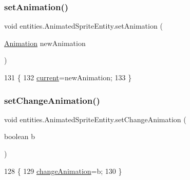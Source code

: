 \subsubsection{\texorpdfstring{set\+Animation()}{setAnimation()}}
{\footnotesize\ttfamily void entities.\+Animated\+Sprite\+Entity.\+set\+Animation (\begin{DoxyParamCaption}\item[{\mbox{\hyperlink{classorg_1_1newdawn_1_1slick_1_1_animation}{Animation}}}]{new\+Animation }\end{DoxyParamCaption})\hspace{0.3cm}{\ttfamily [inline]}}


\begin{DoxyCode}
131                                                     \{
132         \mbox{\hyperlink{classentities_1_1_animated_sprite_entity_ab44999a4be67c7ce81f4da6b5d333ce5}{current}}=newAnimation;
133     \}
\end{DoxyCode}
\mbox{\label{classentities_1_1_animated_sprite_entity_a8732d4ec11ec60bf0a1f91811f16b67b}} 
\subsubsection{\texorpdfstring{set\+Change\+Animation()}{setChangeAnimation()}}
{\footnotesize\ttfamily void entities.\+Animated\+Sprite\+Entity.\+set\+Change\+Animation (\begin{DoxyParamCaption}\item[{boolean}]{b }\end{DoxyParamCaption})\hspace{0.3cm}{\ttfamily [inline]}}


\begin{DoxyCode}
128                                              \{
129         \mbox{\hyperlink{classentities_1_1_animated_sprite_entity_ac5b06797e6a716cb04b883d92301fabf}{changeAnimation}}=b;
130     \}
\end{DoxyCode}
\mbox{\label{classentities_1_1_animated_sprite_entity_a6d6fde757faa1c53b41f9cd7b1494c88}} 
